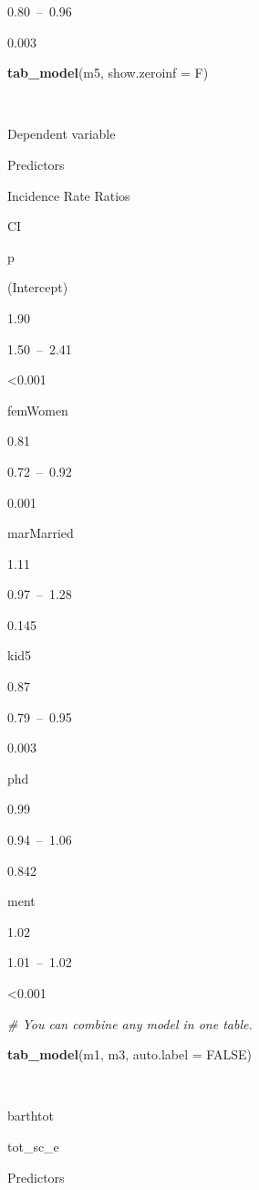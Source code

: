 \documentclass[]{article}
\newenvironment{Shaded}{\begin{snugshade}}{\end{snugshade}}
\newcommand{\KeywordTok}[1]{\textcolor[rgb]{0.13,0.29,0.53}{\textbf{#1}}}
\newcommand{\DataTypeTok}[1]{\textcolor[rgb]{0.13,0.29,0.53}{#1}}
\newcommand{\CommentTok}[1]{\textcolor[rgb]{0.56,0.35,0.01}{\textit{#1}}}
\newcommand{\OtherTok}[1]{\textcolor[rgb]{0.56,0.35,0.01}{#1}}
\newcommand{\NormalTok}[1]{#1}
\begin{document}
0.80~--~0.96

0.003

\begin{Shaded}
\begin{Highlighting}[]
\KeywordTok{tab_model}\NormalTok{(m5, }\DataTypeTok{show.zeroinf =}\NormalTok{ F)}
\end{Highlighting}
\end{Shaded}

~

Dependent variable

Predictors

Incidence Rate Ratios

CI

p

(Intercept)

1.90

1.50~--~2.41

\textless{}0.001

femWomen

0.81

0.72~--~0.92

0.001

marMarried

1.11

0.97~--~1.28

0.145

kid5

0.87

0.79~--~0.95

0.003

phd

0.99

0.94~--~1.06

0.842

ment

1.02

1.01~--~1.02

\textless{}0.001

\begin{Shaded}
\begin{Highlighting}[]
\CommentTok{# You can combine any model in one table.}

\KeywordTok{tab_model}\NormalTok{(m1, m3, }\DataTypeTok{auto.label =} \OtherTok{FALSE}\NormalTok{)}
\end{Highlighting}
\end{Shaded}

~

barthtot

tot\_sc\_e

Predictors
\end{document}
